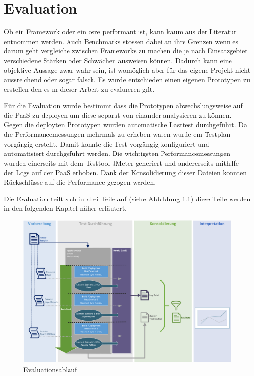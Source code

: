 \documentclass[main.tex]{subfiles}
\begin{document}
\chapter{Evaluation}

Ob ein Framework oder ein \gls{osre} performant ist, kann kaum aus der Literatur entnommen werden. Auch Benchmarks stossen dabei an ihre Grenzen wenn es darum geht vergleiche zwischen Frameworks zu machen die je nach Einsatzgebiet verschiedene Stärken oder Schwächen ausweisen können. Dadurch kann eine objektive Aussage zwar wahr sein,  ist womöglich aber für das eigene Projekt nicht aussreichend oder sogar falsch. Es wurde entschieden einen eigenen Prototypen zu erstellen den es in dieser Arbeit  zu evaluieren gilt. 

Für die Evaluation wurde bestimmt dass  die Prototypen abwechslungsweise auf die PaaS zu deployen um diese separat von einander analysieren zu können. Gegen die deployten Prototypen wurden automatische Lasttest durchgeführt. Da die Performancemessungen mehrmals zu erheben waren  wurde ein Testplan vorgängig erstellt. Damit konnte die Test vorgängig konfiguriert und automatisiert durchgeführt werden. Die wichtigsten Performancemessungen wurden einerseits mit dem Testtool JMeter generiert und andererseits mithilfe der Logs auf der PaaS erhoben. Dank der Konsolidierung dieser Dateien konnten Rückschlüsse auf die Performance gezogen werden.

Die Evaluation teilt sich in drei Teile auf (siehe Abbildung \ref{figure:evaluationsAblauf}) diese Teile werden in den folgenden Kapitel näher erläutert. 

\begin{figure}[h]
\includegraphics[width=\textwidth]{mainpart/3_methodik_evaluation_img/Testablauf.png}
 \caption{Evaluationsablauf}
 \label{figure:evaluationsAblauf}
\end{figure}
\end{document}
